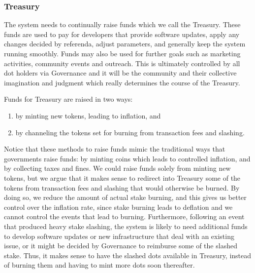 \subsubsection{Treasury}

 The system needs to continually raise funds which we call the Treasury.
 These funds are used to pay for developers that provide software updates, apply any changes decided by referenda, adjust parameters, and generally keep the system running smoothly. Funds may also be used for further goals such as marketing activities, community events and outreach. This is ultimately controlled by all dot holders via Governance and it will be the community and their collective imagination and judgment which really determines the course of the Treasury.

Funds for Treasury are raised in two ways:

\begin{enumerate}
\item by minting new tokens, leading to inflation, and
\item by channeling the tokens set for burning from transaction fees and slashing.
\end{enumerate}

 
Notice that these methods to raise funds mimic the traditional ways that governments raise funds: by minting coins which leads to controlled inflation, and by collecting taxes and fines.
We could raise funds solely from minting new tokens, but we argue that it makes sense to redirect into Treasury some of the tokens from transaction fees and slashing that would otherwise be burned. By doing so, we reduce the amount of actual stake burning, and this gives us better control over the inflation rate, since stake burning leads to deflation and we cannot control the events that lead to burning. Furthermore, following an event that produced heavy stake slashing, the system is likely to need additional funds to develop software updates or new infrastructure that deal with an existing issue, or it might be decided by Governance to reimburse some of the slashed stake. Thus, it makes sense to have the slashed dots available in Treasury, instead of burning them and having to mint more dots soon thereafter.
